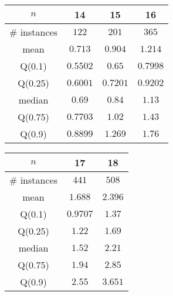 \begin{tabular}{c|ccc} 
\hline 
$n$ & 14 & 15 & 16 \tabularnewline 
\hline 
\hline 
\# instances & $122$ & $201$ & $365$ \tabularnewline 
mean & $0.713$ & $0.904$ & $1.214$ \tabularnewline 
Q(0.1) & $0.5502$ & $0.65$ & $0.7998$ \tabularnewline 
Q(0.25) & $0.6001$ & $0.7201$ & $0.9202$ \tabularnewline 
median & $0.69$ & $0.84$ & $1.13$ \tabularnewline 
Q(0.75) & $0.7703$ & $1.02$ & $1.43$ \tabularnewline 
Q(0.9) & $0.8899$ & $1.269$ & $1.76$ \tabularnewline 
\hline 
\end{tabular} 
\medskip{} 

\begin{tabular}{c|cc} 
\hline 
$n$ & 17 & 18 \tabularnewline 
\hline 
\hline 
\# instances & $441$ & $508$ \tabularnewline 
mean & $1.688$ & $2.396$ \tabularnewline 
Q(0.1) & $0.9707$ & $1.37$ \tabularnewline 
Q(0.25) & $1.22$ & $1.69$ \tabularnewline 
median & $1.52$ & $2.21$ \tabularnewline 
Q(0.75) & $1.94$ & $2.85$ \tabularnewline 
Q(0.9) & $2.55$ & $3.651$ \tabularnewline 
\hline 
\end{tabular} 
\medskip{} 

